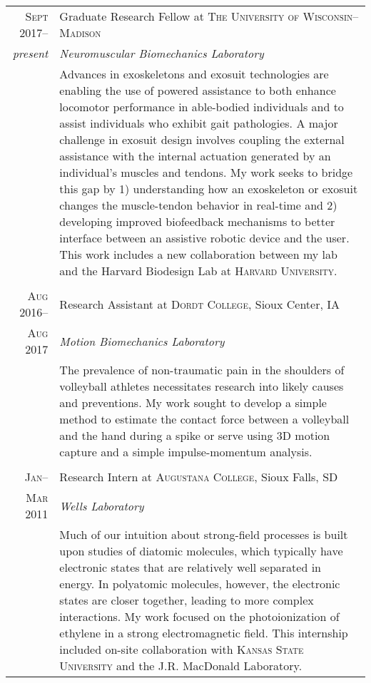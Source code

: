 \documentclass[a4paper,10pt]{article} %
\begin{document}
\begin{tabular}{r|p{11cm}}
\textsc{Sept 2017--} & Graduate Research Fellow at \textsc{The University of Wisconsin--Madison} \\
\emph{present} & \emph{Neuromuscular Biomechanics Laboratory}\\ 
& \footnotesize{
Advances in exoskeletons and exosuit technologies are enabling the use of powered assistance to both enhance locomotor performance in able-bodied individuals and to assist individuals who exhibit gait pathologies. A major challenge in exosuit design involves coupling the external assistance with the internal actuation generated by an individual’s muscles and tendons. My work seeks to bridge this gap by 1) understanding how an exoskeleton or exosuit changes the muscle-tendon behavior in real-time and 2) developing improved biofeedback mechanisms to better interface between an assistive robotic device and the user. This work includes a new collaboration between my lab and the Harvard Biodesign Lab at \textsc{Harvard University}.
}\\
\multicolumn{2}{c}{} \\


\textsc{Aug 2016--} & Research Assistant at \textsc{Dordt College}, Sioux Center, IA \emph{}\\
\textsc{Aug 2017} & \emph{Motion Biomechanics Laboratory}\\ 
& \footnotesize{
The prevalence of non-traumatic pain in the shoulders of volleyball athletes necessitates research into likely causes and preventions. My work sought to develop a simple method to estimate the contact force between a volleyball and the hand during a spike or serve using 3D motion capture and a simple impulse-momentum analysis.
}\\
\multicolumn{2}{c}{} \\


\textsc{Jan--} & Research Intern at \textsc{Augustana College}, Sioux Falls, SD \emph{}\\
\textsc{Mar 2011} & \emph{Wells Laboratory} \\
& \footnotesize{
Much of our intuition about strong-field processes is built upon studies of diatomic molecules, which typically have electronic states that are relatively well separated in energy. In polyatomic molecules, however, the electronic states are closer together, leading to more complex interactions. My work focused on the photoionization of ethylene in a strong electromagnetic field. This internship included on-site collaboration with \textsc{Kansas State University} and the J.R. MacDonald Laboratory.
} \\
\end{tabular}
\end{document}
